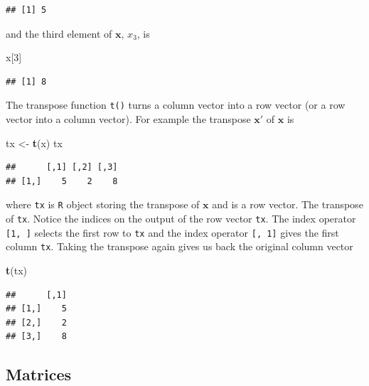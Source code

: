 \documentclass[
]{book}
\newenvironment{Shaded}{\begin{snugshade}}{\end{snugshade}}
\newcommand{\DecValTok}[1]{\textcolor[rgb]{0.00,0.00,0.81}{#1}}
\newcommand{\KeywordTok}[1]{\textcolor[rgb]{0.13,0.29,0.53}{\textbf{#1}}}
\newcommand{\NormalTok}[1]{#1}
\newcommand{\StringTok}[1]{\textcolor[rgb]{0.31,0.60,0.02}{#1}}
\theoremstyle{definition}
\theoremstyle{definition}
\theoremstyle{definition}
\theoremstyle{remark}
\begin{document}
\begin{verbatim}
## [1] 5
\end{verbatim}

and the third element of \(\mathbf{x}\), \(x_3\), is

\begin{Shaded}
\begin{Highlighting}[]
\NormalTok{x[}\DecValTok{3}\NormalTok{]}
\end{Highlighting}
\end{Shaded}

\begin{verbatim}
## [1] 8
\end{verbatim}

The transpose function \texttt{t()} turns a column vector into a row vector (or a row vector into a column vector). For example the transpose \(\mathbf{x}'\) of \(\mathbf{x}\) is

\begin{Shaded}
\begin{Highlighting}[]
\NormalTok{tx <-}\StringTok{ }\KeywordTok{t}\NormalTok{(x)}
\NormalTok{tx}
\end{Highlighting}
\end{Shaded}

\begin{verbatim}
##      [,1] [,2] [,3]
## [1,]    5    2    8
\end{verbatim}

where \texttt{tx} is \texttt{R} object storing the transpose of \(\mathbf{x}\) and is a row vector. The transpose of \texttt{tx}. Notice the indices on the output of the row vector \texttt{tx}. The index operator \texttt{{[}1,\ {]}} selects the first row to \texttt{tx} and the index operator \texttt{{[},\ 1{]}} gives the first column \texttt{tx}. Taking the transpose again gives us back the original column vector

\begin{Shaded}
\begin{Highlighting}[]
\KeywordTok{t}\NormalTok{(tx)}
\end{Highlighting}
\end{Shaded}

\begin{verbatim}
##      [,1]
## [1,]    5
## [2,]    2
## [3,]    8
\end{verbatim}

\hypertarget{matrices}{%
\subsection{Matrices}\label{matrices}}
\end{document}
